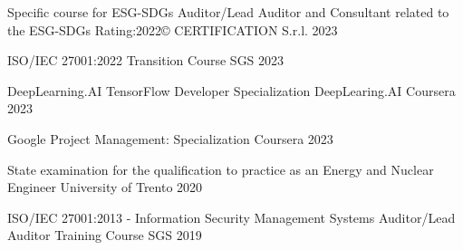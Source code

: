 

\begin{cvhonors}

  \cvhonor
  {Specific course for ESG-SDGs Auditor/Lead Auditor and Consultant related to the ESG-SDGs Rating:2022©} %
  {} %
  {CERTIFICATION S.r.l.} %
  {2023} %

  \cvhonor
  {ISO/IEC 27001:2022 Transition Course} %
  {} %
  {SGS} %
  {2023} %

  \cvhonor
  {DeepLearning.AI TensorFlow Developer Specialization} %
  {DeepLearing.AI} %
  {Coursera} %
  {2023} %

  \cvhonor
  {Google Project Management: Specialization} %
  {} %
  {Coursera} %
  {2023} %

  \cvhonor
  {State examination for the qualification to practice as an Energy and Nuclear Engineer} %
  {} %
  {University of Trento} %
  {2020} %

  \cvhonor
  {ISO/IEC 27001:2013 - Information Security Management Systems Auditor/Lead Auditor Training Course} %
  {} %
  {SGS} %
  {2019} %

\end{cvhonors}
